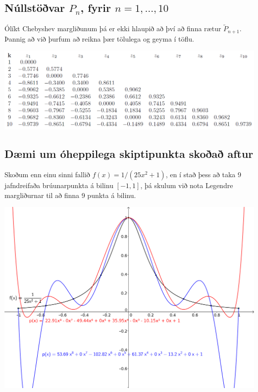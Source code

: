 \documentclass[letterpaper,10pt,icelandic]{sphinxmanual}
\begin{document}
\subsection{Núllstöðvar \(P_n\), fyrir \(n=1,\ldots,10\)}
\label{kafli03:nullstovar-fyrir}
Ólíkt Chebyshev margliðunum þá er ekki hlaupið að því að finna rætur
\(\tilde P_{n+1}\). Þannig að við þurfum að reikna þær tölulega og
geyma í töflu.

\includegraphics{legendre.png}


\subsection{Dæmi um óheppilega skiptipunkta skoðað aftur}
\label{kafli03:id7}
Skoðum enn einu sinni fallið \(f(x) = 1/(25x^2+1)\), en í stað þess
að taka 9 jafndreifaða brúunarpunkta á bilinu \([-1,1]\), þá skulum
við nota Legendre margliðurnar til að finna 9 punkta á bilinu.

\includegraphics{vond_bruun3.png}
\end{document}
